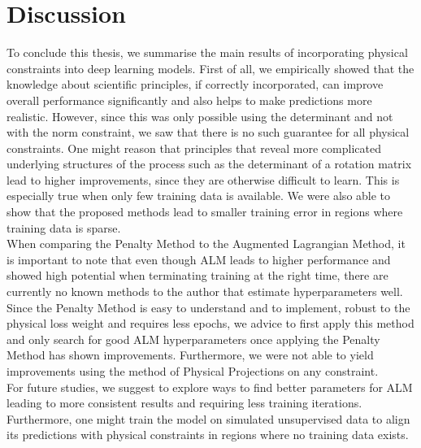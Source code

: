 \label{section:discussion}
\section{Discussion}

To conclude this thesis, we summarise the main results of incorporating physical constraints into deep learning models. First of all, we empirically showed that the knowledge about scientific principles, if correctly incorporated, can improve overall performance significantly and also helps to make predictions more realistic. However, since this was only possible using the determinant and not with the norm constraint, we saw that there is no such guarantee for all physical constraints. One might reason that principles that reveal more complicated underlying structures of the process such as the determinant of a rotation matrix lead to higher improvements, since they are otherwise difficult to learn. This is especially true when only few training data is available. We were also able to show that the proposed methods lead to smaller training error in regions where training data is sparse.\\
\indent When comparing the Penalty Method to the Augmented Lagrangian Method, it is important to note that even though ALM leads to higher performance and showed high potential when terminating training at the right time, there are currently no known methods to the author that estimate hyperparameters well. Since the Penalty Method is easy to understand   and to implement, robust to the physical loss weight and requires less epochs, we advice to first apply this method and only search for good ALM hyperparameters once applying the Penalty Method has shown improvements. Furthermore, we were not able to yield improvements using the method of Physical Projections on any constraint.\\
\indent For future studies, we suggest to explore ways to find better parameters for ALM leading to more consistent results and requiring less training iterations. Furthermore, one might train the model on simulated unsupervised data to align its predictions with physical constraints in regions where no training data exists.









\clearpage

